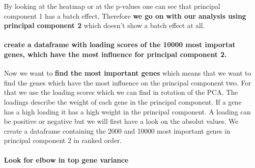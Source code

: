\documentclass[]{article}
\newenvironment{Shaded}{\begin{snugshade}}{\end{snugshade}}
\newcommand{\KeywordTok}[1]{\textcolor[rgb]{0.13,0.29,0.53}{\textbf{#1}}}
\newcommand{\DataTypeTok}[1]{\textcolor[rgb]{0.13,0.29,0.53}{#1}}
\newcommand{\DecValTok}[1]{\textcolor[rgb]{0.00,0.00,0.81}{#1}}
\newcommand{\StringTok}[1]{\textcolor[rgb]{0.31,0.60,0.02}{#1}}
\newcommand{\OtherTok}[1]{\textcolor[rgb]{0.56,0.35,0.01}{#1}}
\newcommand{\OperatorTok}[1]{\textcolor[rgb]{0.81,0.36,0.00}{\textbf{#1}}}
\newcommand{\NormalTok}[1]{#1}
\let\oldparagraph\paragraph
\renewcommand{\paragraph}[1]{\oldparagraph{#1}\mbox{}}
\begin{document}
By looking at the heatmap or at the p-values one can see that principal
component 1 has a batch effect. Therefore \textbf{we go on with our
analysis using principal component 2} which doesn't show a batch effect
at all.

\paragraph{create a dataframe with loading scores of the 10000 most
importat genes, which have the most influence for principal component
2.}\label{create-a-dataframe-with-loading-scores-of-the-10000-most-importat-genes-which-have-the-most-influence-for-principal-component-2.}

Now we want to \textbf{find the most important genes} which means that
we want to find the genes which have the most influence on the principal
component two. For that we use the loading scores which we can find in
rotation of the PCA. The loadings describe the weight of each gene in
the principal component. If a gene has a high loading it has a high
weight in the principal component. A loading can be positive or negative
but we will first have a look on the absolut values. We create a
dataframe containing the 2000 and 10000 most important genes in
principal component 2 in ranked order.

\begin{Shaded}
\end{Shaded}

\paragraph{Look for elbow in top gene
variance}\label{look-for-elbow-in-top-gene-variance}
\end{document}

